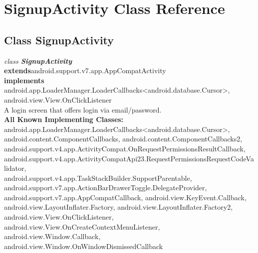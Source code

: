 \hypertarget{class_SignupActivity.Android}{\section{SignupActivity Class Reference}
\label{class_SignupActivity.Android}
}

\subsection*{Class SignupActivity}

\textit{class \textbf{SignupActivity}}\\
\tab \textbf{extends}android.support.v7.app.AppCompatActivity\\
\tab \textbf{implements} android.app.LoaderManager.LoaderCallbacks<android.database.Cursor>, android.view.View.OnClickListener\\


A login screen that offers login via email/password.\\


\textbf{All Known Implementing Classes:}\\
\tab            android.app.LoaderManager.LoaderCallbacks<android.database.Cursor>,\\
 android.content.ComponentCallbacks, android.content.ComponentCallbacks2, \\
 android.support.v4.app.ActivityCompat.OnRequestPermissionsResultCallback, \\
 android.support.v4.app.ActivityCompatApi23.RequestPermissionsRequestCodeValidator, \\
 android.support.v4.app.TaskStackBuilder.SupportParentable, \\
 android.support.v7.app.ActionBarDrawerToggle.DelegateProvider, \\
 android.support.v7.app.AppCompatCallback, android.view.KeyEvent.Callback, \\
 android.view.LayoutInflater.Factory, android.view.LayoutInflater.Factory2, \\
 android.view.View.OnClickListener, android.view.View.OnCreateContextMenuListener, \\
 android.view.Window.Callback, android.view.Window.OnWindowDismissedCallback\\



